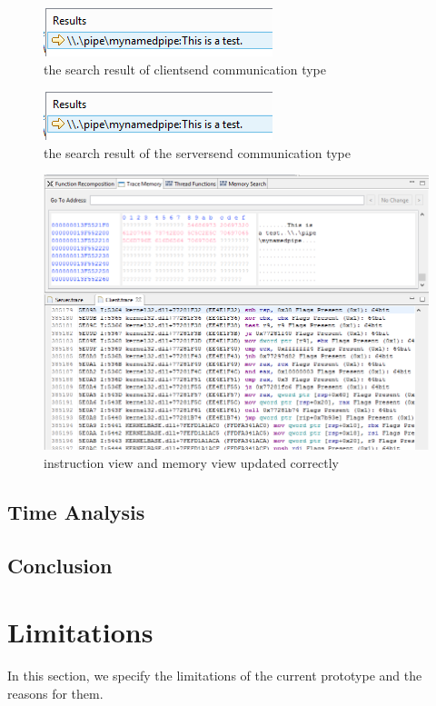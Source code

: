 \documentclass[paper=a4, fontsize=11pt]{scrartcl}
\numberwithin{equation}{section}		%
\numberwithin{figure}{section}			%
\numberwithin{table}{section}				%
\begin{document}
\begin{figure}[h]
\includegraphics{occclientresult}
 \caption{the search result of clientsend communication type}
\label{occclientresult}
\end{figure}


\begin{figure}[h]
\includegraphics{occclientresult}
 \caption{the search result of the serversend communication type}
\label{occclientresult}
\end{figure}

\begin{figure}[h]
\includegraphics[scale=.66]{send}
 \caption{instruction view and memory view updated correctly}
\label{send}
\end{figure}

\subsection{Time Analysis}
\subsection{Conclusion}
\section{Limitations}
In this section, we specify the limitations of the current prototype and the reasons for them. 
\end{document}
